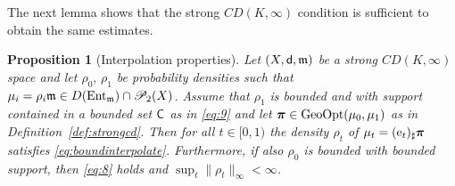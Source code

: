 \documentclass[reqno,11pt]{article}
\numberwithin{equation}{section}
\newcommand{\mm}{{\mbox{\boldmath$m$}}}
\newcommand{\ppi}{{\mbox{\boldmath$\pi$}}}
\newcommand{\sfd}{{\sf d}}
\newcommand{\ProbabilitiesTwo}[1]{\mathscr P_2(#1)}     %
\newtheorem{proposition}[theorem]{Proposition}
\newcommand{\entv}{{\rm Ent}_{\mm}}                    %
\newcommand{\probt}{\ProbabilitiesTwo}
\newcommand{\e}{{\rm{e}}}                           %
\newcommand{\gopt}{{\rm{GeoOpt}}}                   %
\renewcommand{\mm}{\mathfrak m}
\begin{document}
The next lemma shows that the strong $CD(K,\infty)$ condition is
sufficient to obtain the same estimates.

\begin{proposition}[Interpolation properties]\label{prop:intpropr}
Let $(X,\sfd,\mm)$ be a strong $CD(K,\infty)$ space and let
$\rho_0,\,\rho_1$ be probability densities such that
$\mu_i=\rho_i\mm\in D(\entv)\cap\probt X$. Assume that $\rho_1$ is
bounded and with support contained in a bounded set ${\sf C}$ as in
\eqref{eq:9} and let $\ppi\in\gopt(\mu_0,\mu_1)$ as in
Definition~\ref{def:strongcd}. Then for all $t\in [0,1)$ the density
$\rho_t$ of $\mu_t=(\e_t)_\sharp\ppi$ satisfies
\eqref{eq:boundinterpolate}. Furthermore, if also $\rho_0$ is
bounded with bounded support, then \eqref{eq:8} holds and
$\sup_t\|\rho_t\|_\infty<\infty$.
\end{proposition}
\end{document}
